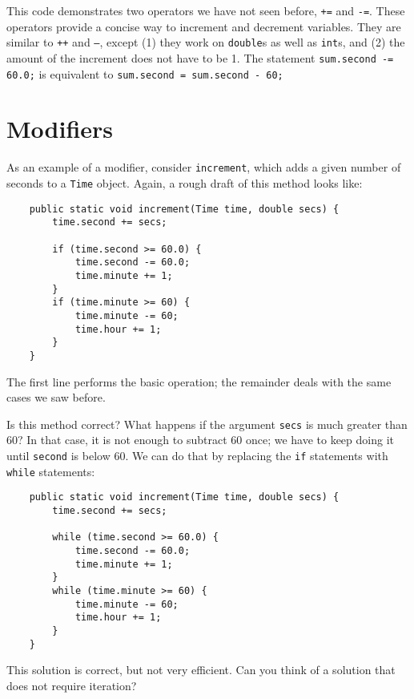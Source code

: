\documentclass[12pt]{book}
\theoremstyle{definition}
\begin{document}

This code demonstrates two operators we have not seen before,
{\tt +=} and {\tt -=}.  These operators provide a concise
way to increment and decrement variables.  They are similar
to {\tt ++} and {\tt --}, except (1) they work on {\tt double}s
as well as {\tt int}s, and (2) the amount of the increment
does not have to be 1.  The statement {\tt sum.second -= 60.0;}
is equivalent to {\tt sum.second = sum.second - 60;}


\section{Modifiers}

As an example of a modifier, consider {\tt increment},
which adds a given number of seconds to a {\tt Time} object.
Again, a rough draft of this method looks like:

\begin{lstlisting}
    public static void increment(Time time, double secs) {
        time.second += secs;

        if (time.second >= 60.0) {
            time.second -= 60.0;
            time.minute += 1;
        }
        if (time.minute >= 60) {
            time.minute -= 60;
            time.hour += 1;
        }
    }
\end{lstlisting}
%
The first line performs the basic operation; the remainder
deals with the same cases we saw before.

Is this method correct?  What happens if the argument {\tt secs}
is much greater than 60?  In that case, it is not enough to
subtract 60 once; we have to keep doing it until {\tt second}
is below 60.  We can do that by replacing the {\tt if}
statements with {\tt while} statements:

\begin{lstlisting}
    public static void increment(Time time, double secs) {
        time.second += secs;

        while (time.second >= 60.0) {
            time.second -= 60.0;
            time.minute += 1;
        }
        while (time.minute >= 60) {
            time.minute -= 60;
            time.hour += 1;
        }
    }
\end{lstlisting}
%
This solution is correct, but not very efficient.
Can you think of a solution that does not require iteration?
\end{document}
